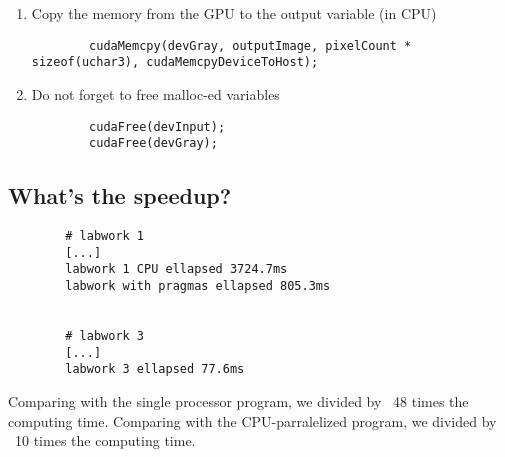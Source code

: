 \documentclass{article}
\begin{document}
\begin{enumerate}
\begin{verbatim}
        \end{verbatim}
        
        \item Copy the memory from the GPU to the output variable (in CPU)
        \begin{verbatim}
        cudaMemcpy(devGray, outputImage, pixelCount * sizeof(uchar3), cudaMemcpyDeviceToHost);
        \end{verbatim}
        
        \item Do not forget to free malloc-ed variables
        \begin{verbatim}
        cudaFree(devInput);
        cudaFree(devGray);
        \end{verbatim}
    
    \end{enumerate}
    
\subsection{What’s the speedup?}
    
    \begin{verbatim}
        # labwork 1
        [...]
        labwork 1 CPU ellapsed 3724.7ms
        labwork with pragmas ellapsed 805.3ms
        
        
        # labwork 3
        [...]
        labwork 3 ellapsed 77.6ms
    \end{verbatim}
    
    Comparing with the single processor program, we divided by ~48 times the computing time. 
    Comparing with the CPU-parralelized program, we divided by ~10 times the computing time. 
    
\end{document}
